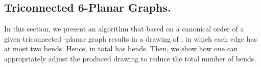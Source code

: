 \documentclass[a4paper,twoside,11pt]{article}
\begin{document}
\subsection{Triconnected 6-Planar Graphs.}
\label{sec:6planar}


In this section, we present an algorithm that based on a canonical
order  of a given triconnected
-planar graph  results in a drawing  of ,
in which each edge has at most two bends. Hence, in total
 has  bends. Then, we show how one can
appropriately adjust the produced drawing to reduce the total
number of bends.

\begin{figure}[b!]
    \centering 
    \begin{minipage}[b]{.14\textwidth}
        \centering
    \end{minipage} 
    \hfill
    \begin{minipage}[b]{.14\textwidth}
        \centering
    \end{minipage}  
    \hfill
    \begin{minipage}[b]{.14\textwidth} 
        \centering
    \end{minipage}  
    \hfill
    \begin{minipage}[b]{.14\textwidth}
        \centering
    \end{minipage}  
    \hfill
    \begin{minipage}[b]{.14\textwidth}
        \centering
    \end{minipage}  
    \hfill
    \begin{minipage}[b]{.14\textwidth}
        \centering
    \end{minipage}  
    \hfill
    \begin{minipage}[b]{.18\textwidth}
        \centering
    \end{minipage}  
    \hfill
    \begin{minipage}[b]{.18\textwidth}

\end{minipage}
\end{figure}
\end{document}

